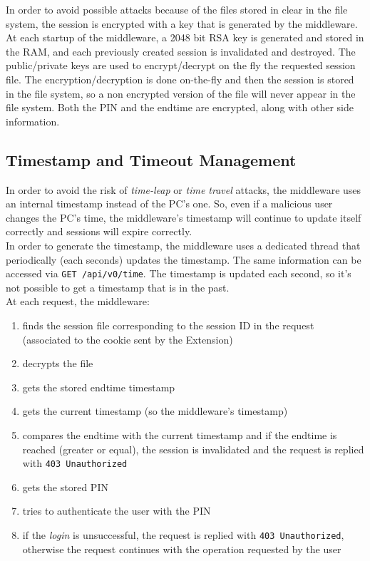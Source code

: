 In order to avoid possible attacks because of the files stored in clear in the file system, the session is encrypted with a key that is generated by the middleware. At each startup of the middleware, a 2048 bit RSA key is generated and stored in the RAM, and each previously created session is invalidated and destroyed. The public/private keys are used to encrypt/decrypt on the fly the requested session file. The encryption/decryption is done on-the-fly and then the session is stored in the file system, so a non encrypted version of the file will never appear in the file system. Both the PIN and the endtime are encrypted, along with other side information.

\subsection{Timestamp and Timeout Management}
In order to avoid the risk of \textit{time-leap} or \textit{time travel} attacks, the middleware uses an internal timestamp instead of the PC's one. So, even if a malicious user changes the PC's time, the middleware's timestamp will continue to update itself correctly and sessions will expire correctly.\\

In order to generate the timestamp, the middleware uses a dedicated thread that periodically (each seconds) updates the timestamp. The same information can be accessed via \texttt{GET /api/v0/time}. The timestamp is updated each second, so it's not possible to get a timestamp that is in the past.\\

At each request, the middleware:

\begin{enumerate}
    \item finds the session file corresponding to the session ID in the request (associated to the cookie sent by the Extension)
    \item decrypts the file
    \item gets the stored endtime timestamp
    \item gets the current timestamp (so the middleware's timestamp)
    \item compares the endtime with the current timestamp and if the endtime is reached (greater or equal), the session is invalidated and the request is replied with \texttt{403 Unauthorized}
    \item gets the stored PIN
    \item tries to authenticate the user with the PIN
    \item if the \textit{login} is unsuccessful, the request is replied with \texttt{403 Unauthorized}, otherwise the request continues with the operation requested by the user 
\end{enumerate}

